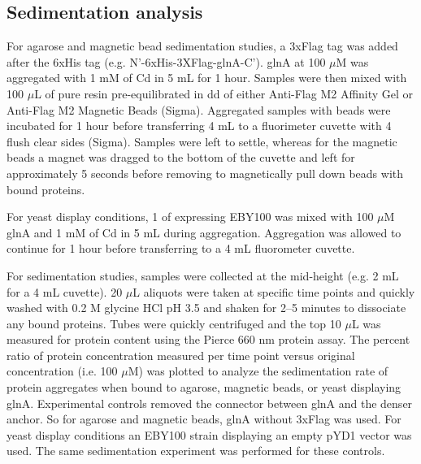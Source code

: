 \documentclass[../main/main]{subfiles}
\begin{document}
\subsection*{Sedimentation analysis}
For agarose and magnetic bead sedimentation studies, a 3xFlag tag was added after the 6xHis tag (e.g. N'-6xHis-3XFlag-glnA-C'). glnA at 100 $\mu$M was aggregated with 1 mM of Cd in 5 mL for 1 hour. Samples were then mixed with 100 $\mu$L of pure resin pre-equilibrated in dd of either Anti-Flag M2 Affinity Gel or Anti-Flag M2 Magnetic Beads (Sigma). Aggregated samples with beads were incubated for 1 hour before transferring 4 mL to a fluorimeter cuvette with 4 flush clear sides (Sigma). Samples were left to settle, whereas for the magnetic beads a magnet was dragged to the bottom of the cuvette and left for approximately 5 seconds before removing to magnetically pull down beads with bound proteins.

For yeast display conditions, 1 \OD{} of expressing EBY100 was mixed with 100 $\mu$M glnA and 1 mM of Cd in 5 mL during aggregation. Aggregation was allowed to continue for 1 hour before transferring to a 4 mL fluorometer cuvette.

For sedimentation studies, samples were collected at the mid-height (e.g. 2 mL for a 4 mL cuvette). 20 $\mu$L aliquots were taken at specific time points and quickly washed with 0.2 M glycine HCl pH 3.5 and shaken for 2--5 minutes to dissociate any bound proteins. Tubes were quickly centrifuged and the top 10 $\mu$L was measured for protein content using the Pierce 660 nm protein assay. The percent ratio of protein concentration measured per time point versus original concentration (i.e. 100 $\mu$M) was plotted to analyze the sedimentation rate of protein aggregates when bound to agarose, magnetic beads, or yeast displaying glnA. Experimental controls removed the connector between glnA and the denser anchor. So for agarose and magnetic beads, glnA without 3xFlag was used. For yeast display conditions an EBY100 strain displaying an empty pYD1 vector was used. The same sedimentation experiment was performed for these controls.
\end{document}
